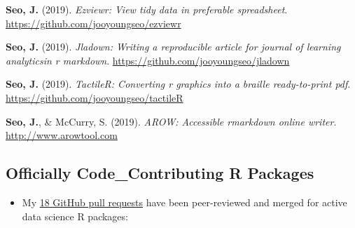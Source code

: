 \documentclass[11pt, a4paper]{awesome-cv}
\providecommand{\tightlist}{%
	\setlength{\itemsep}{0pt}\setlength{\parskip}{0pt}}
\begin{document}
\leavevmode\hypertarget{ref-R-ezviewr}{}%
\textbf{Seo, J.} (2019). \emph{Ezviewr: View tidy data in preferable spreadsheet}. \url{https://github.com/jooyoungseo/ezviewr}

\leavevmode\hypertarget{ref-R-jladown}{}%
\textbf{Seo, J.} (2019). \emph{Jladown: Writing a reproducible article for journal of learning analyticsin r markdown}. \url{https://github.com/jooyoungseo/jladown}

\leavevmode\hypertarget{ref-R-tactileR}{}%
\textbf{Seo, J.} (2019). \emph{TactileR: Converting r graphics into a braille ready-to-print pdf}. \url{https://github.com/jooyoungseo/tactileR}

\leavevmode\hypertarget{ref-webrender}{}%
\textbf{Seo, J.}, \& McCurry, S. (2019). \emph{AROW: Accessible rmarkdown online writer}. \url{http://www.arowtool.com}

\endgroup

\hypertarget{officially-code_contributing-r-packages}{%
\subsection{Officially Code\_Contributing R Packages}\label{officially-code_contributing-r-packages}}

\begin{itemize}
\tightlist
\item
  My \href{https://github.com/pulls?q=is\%3Apr+author\%3Ajooyoungseo+archived\%3Afalse+is\%3Aclosed}{18 GitHub pull requests} have been peer-reviewed and merged for active data science R packages:
\end{itemize}
\end{document}
